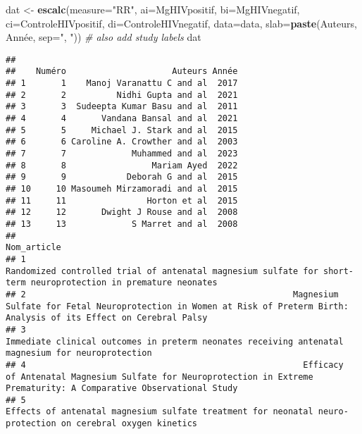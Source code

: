 \documentclass[
]{article}
\newenvironment{Shaded}{\begin{snugshade}}{\end{snugshade}}
\newcommand{\AttributeTok}[1]{\textcolor[rgb]{0.13,0.29,0.53}{#1}}
\newcommand{\CommentTok}[1]{\textcolor[rgb]{0.56,0.35,0.01}{\textit{#1}}}
\newcommand{\FunctionTok}[1]{\textcolor[rgb]{0.13,0.29,0.53}{\textbf{#1}}}
\newcommand{\NormalTok}[1]{#1}
\newcommand{\OtherTok}[1]{\textcolor[rgb]{0.56,0.35,0.01}{#1}}
\newcommand{\StringTok}[1]{\textcolor[rgb]{0.31,0.60,0.02}{#1}}
\begin{document}
\begin{Shaded}
\begin{Highlighting}[]
\NormalTok{dat }\OtherTok{\textless{}{-}} \FunctionTok{escalc}\NormalTok{(}\AttributeTok{measure=}\StringTok{"RR"}\NormalTok{, }\AttributeTok{ai=}\NormalTok{MgHIVpositif, }\AttributeTok{bi=}\NormalTok{MgHIVnegatif, }\AttributeTok{ci=}\NormalTok{ControleHIVpositif, }\AttributeTok{di=}\NormalTok{ControleHIVnegatif, }\AttributeTok{data=}\NormalTok{data,}
              \AttributeTok{slab=}\FunctionTok{paste}\NormalTok{(Auteurs, Année, }\AttributeTok{sep=}\StringTok{", "}\NormalTok{)) }\CommentTok{\# also add study labels}
\NormalTok{dat}
\end{Highlighting}
\end{Shaded}

\begin{verbatim}
## 
##    Numéro                     Auteurs Année 
## 1       1    Manoj Varanattu C and al  2017 
## 2       2          Nidhi Gupta and al  2021 
## 3       3  Sudeepta Kumar Basu and al  2011 
## 4       4       Vandana Bansal and al  2021 
## 5       5     Michael J. Stark and al  2015 
## 6       6 Caroline A. Crowther and al  2003 
## 7       7             Muhammed and al  2023 
## 8       8                 Mariam Ayed  2022 
## 9       9            Deborah G and al  2015 
## 10     10 Masoumeh Mirzamoradi and al  2015 
## 11     11                Horton et al  2015 
## 12     12       Dwight J Rouse and al  2008 
## 13     13             S Marret and al  2008 
##                                                                                                                                                                   Nom_article 
## 1                                                             Randomized controlled trial of antenatal magnesium sulfate for short-term neuroprotection in premature neonates 
## 2                                                     Magnesium Sulfate for Fetal Neuroprotection in Women at Risk of Preterm Birth: Analysis of its Effect on Cerebral Palsy 
## 3                                                                           Immediate clinical outcomes in preterm neonates receiving antenatal magnesium for neuroprotection 
## 4                                                       Efficacy of Antenatal Magnesium Sulfate for Neuroprotection in Extreme Prematurity: A Comparative Observational Study 
## 5                                                                  Effects of antenatal magnesium sulfate treatment for neonatal neuro-protection on cerebral oxygen kinetics 

\end{verbatim}
\end{document}

